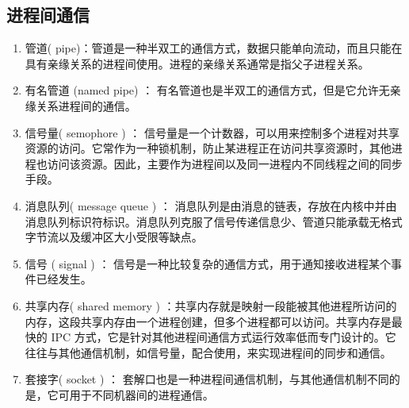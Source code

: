 \documentclass[../../../interview-questions.tex]{subfiles}
\begin{document}
\subsection{进程间通信}


\begin{enumerate}
    \item {管道( pipe)：管道是一种半双工的通信方式，数据只能单向流动，而且只能在具有亲缘关系的进程间使用。进程的亲缘关系通常是指父子进程关系。}
    \item{有名管道 (named pipe) ： 有名管道也是半双工的通信方式，但是它允许无亲缘关系进程间的通信。}
    \item{信号量( semophore ) ： 信号量是一个计数器，可以用来控制多个进程对共享资源的访问。它常作为一种锁机制，防止某进程正在访问共享资源时，其他进程也访问该资源。因此，主要作为进程间以及同一进程内不同线程之间的同步手段。}
    \item{消息队列( message queue ) ： 消息队列是由消息的链表，存放在内核中并由消息队列标识符标识。消息队列克服了信号传递信息少、管道只能承载无格式字节流以及缓冲区大小受限等缺点。}
    \item{信号 ( signal ) ： 信号是一种比较复杂的通信方式，用于通知接收进程某个事件已经发生。}
    \item{共享内存( shared memory ) ：共享内存就是映射一段能被其他进程所访问的内存，这段共享内存由一个进程创建，但多个进程都可以访问。共享内存是最快的 IPC 方式，它是针对其他进程间通信方式运行效率低而专门设计的。它往往与其他通信机制，如信号量，配合使用，来实现进程间的同步和通信。}
    \item{套接字( socket ) ： 套解口也是一种进程间通信机制，与其他通信机制不同的是，它可用于不同机器间的进程通信。}
    \end{enumerate}
\end{document}
